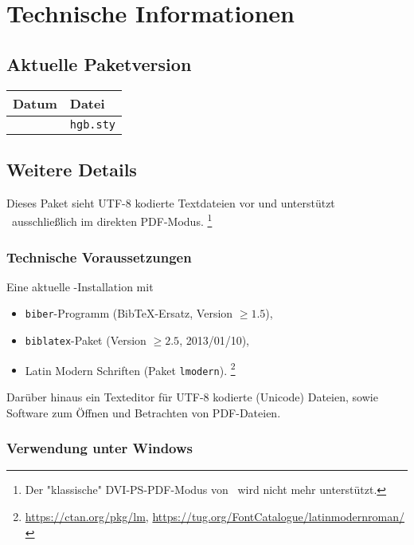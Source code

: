 \chapter{Technische Informationen}
\label{app:TechnischeInfos}

\section{Aktuelle Paketversion}

\begin{center}
	\begin{tabular}{@{}ll@{}}
		\toprule
		Datum    & Datei            \\
		\midrule
		\hgbDate & \texttt{hgb.sty} \\
		\bottomrule
	\end{tabular}
\end{center}


\section{Weitere Details}


Dieses Paket sieht \mbox{UTF-8} kodierte Textdateien vor und
unterstützt \latex\ ausschließlich im direkten PDF-Modus.%
\footnote{Der "klassische" DVI-PS-PDF-Modus von \latex\ wird nicht mehr
unterstützt.}

\subsection{Technische Voraussetzungen}

Eine aktuelle \latex-Installation mit
%
\begin{itemize}
		\item \texttt{biber}-Programm (BibTeX-Ersatz, Version $\geq 1.5$),
		\item \texttt{biblatex}-Paket (Version $\geq 2.5$, 2013/01/10),
		\item Latin Modern Schriften (Paket \texttt{lmodern}).%
			\footnote{\url{https://ctan.org/pkg/lm},
				\url{https://tug.org/FontCatalogue/latinmodernroman/}}
\end{itemize}
%
Darüber hinaus ein Texteditor für UTF-8 kodierte (Unicode) Dateien,
sowie Software zum Öffnen und Betrachten von PDF-Dateien.


\subsection{Verwendung unter Windows}
\label{sec:VerwendungUnterWindows}

